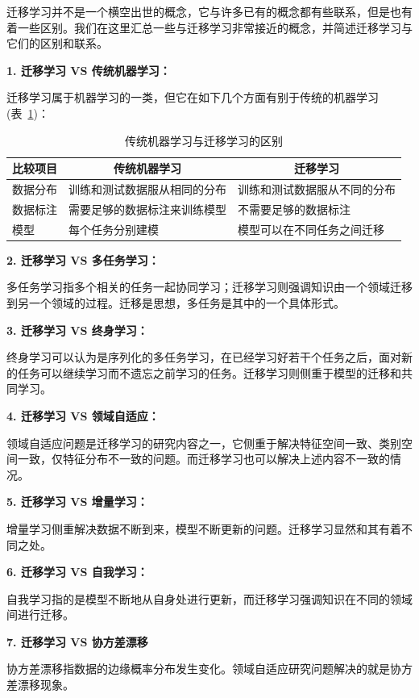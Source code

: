 迁移学习并不是一个横空出世的概念，它与许多已有的概念都有些联系，但是也有着一些区别。我们在这里汇总一些与迁移学习非常接近的概念，并简述迁移学习与它们的区别和联系。

\textbf{1. 迁移学习 VS 传统机器学习：}

迁移学习属于机器学习的一类，但它在如下几个方面有别于传统的机器学习(表~\ref{tb-introduction-machinelearning})：

\begin{table}[htbp]
\centering
\caption{传统机器学习与迁移学习的区别}
\label{tb-introduction-machinelearning}
\begin{tabular}{|l|l|l|}
\hline
\multicolumn{1}{|c|}{\textbf{比较项目}} & \multicolumn{1}{c|}{\textbf{传统机器学习}} & \multicolumn{1}{c|}{\textbf{迁移学习}} \\ \hline
数据分布 & 训练和测试数据服从相同的分布 & 训练和测试数据服从不同的分布 \\ \hline
数据标注 & 需要足够的数据标注来训练模型 & 不需要足够的数据标注 \\ \hline
模型 & 每个任务分别建模 & 模型可以在不同任务之间迁移 \\ \hline
\end{tabular}
\end{table}

\textbf{2. 迁移学习 VS 多任务学习：}

多任务学习指多个相关的任务一起协同学习；迁移学习则强调知识由一个领域迁移到另一个领域的过程。迁移是思想，多任务是其中的一个具体形式。

\textbf{3. 迁移学习 VS 终身学习：}

终身学习可以认为是序列化的多任务学习，在已经学习好若干个任务之后，面对新的任务可以继续学习而不遗忘之前学习的任务。迁移学习则侧重于模型的迁移和共同学习。

\textbf{4. 迁移学习 VS 领域自适应：}

领域自适应问题是迁移学习的研究内容之一，它侧重于解决特征空间一致、类别空间一致，仅特征分布不一致的问题。而迁移学习也可以解决上述内容不一致的情况。

\textbf{5. 迁移学习 VS 增量学习：}

增量学习侧重解决数据不断到来，模型不断更新的问题。迁移学习显然和其有着不同之处。

\textbf{6. 迁移学习 VS 自我学习：}

自我学习指的是模型不断地从自身处进行更新，而迁移学习强调知识在不同的领域间进行迁移。

\textbf{7. 迁移学习 VS 协方差漂移}

协方差漂移指数据的边缘概率分布发生变化。领域自适应研究问题解决的就是协方差漂移现象。

